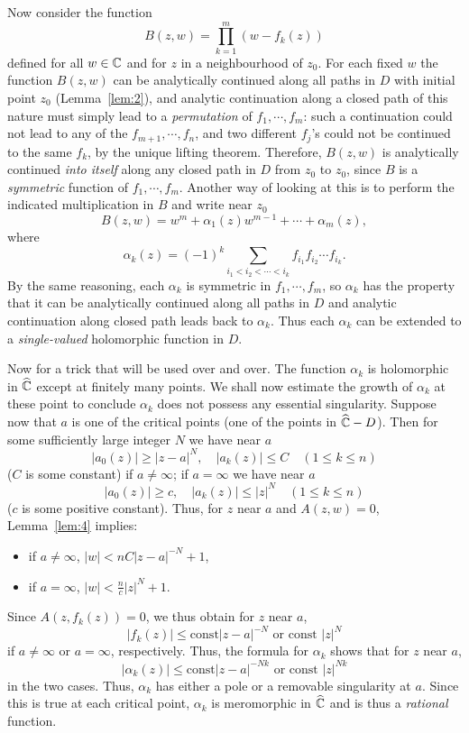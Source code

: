 \documentclass[a4paper,11pt]{article}
\begin{document}
\begin{myproof}
  Now consider the function
  $$
  B(z,w) = \prod_{k=1}^m (w-f_k(z))
  $$
  defined for all $w \in {\mathbb C}$ and for $z$ in a neighbourhood of
  $z_0$.  For each fixed $w$ the function $B(z,w)$ can be analytically
  continued along all paths in $D$ with initial point $z_0$
  (Lemma~\ref{lem:2}), and analytic continuation along a closed path
  of this nature must simply lead to a \emph{permutation} of $f_1,
  \cdots, f_m$: such a continuation could not lead to any of the
  $f_{m+1}, \cdots, f_n$, and two different $f_j$'s could not be
  continued to the same $f_k$, by the unique lifting theorem.
  Therefore, $B(z,w)$ is analytically continued \emph{into itself}
  along any closed path in $D$ from $z_0$ to $z_0$, since $B$ is a
  \emph{symmetric} function of $f_1, \cdots, f_m$.  Another way of
  looking at this is to perform the indicated multiplication in $B$
  and write near $z_0$
  $$
  B(z,w) = w^m + \alpha_1(z) w^{m-1} + \cdots + \alpha_m(z),
  $$
  where
  $$
  \alpha_k(z) = (-1)^k \sum_{i_1 < i_2 < \cdots < i_k} f_{i_1} f_{i_2}
  \cdots f_{i_k}.
  $$
  By the same reasoning, each $\alpha_k$ is symmetric in $f_1, \cdots,
  f_m$, so $\alpha_k$ has the property that it can be analytically
  continued along all paths in $D$ and analytic continuation along
  closed path leads back to $\alpha_k$.  Thus each $\alpha_k$ can be
  extended to a \emph{single-valued} holomorphic function in $D$.

  Now for a trick that will be used over and over.  The function
  $\alpha_k$ is holomorphic in $\widehat{{\mathbb C}}$ except at finitely
  many points.  We shall now estimate the growth of $\alpha_k$ at
  these point to conclude $\alpha_k$ does not possess any essential
  singularity.  Suppose now that $a$ is one of the critical points
  (one of the points in $\widehat{{\mathbb C}}-D$).  Then for some
  sufficiently large integer $N$ we have near $a$
  $$
  |a_0(z)| \ge |z-a|^N, \quad |a_k(z)| \le C \quad (1\le k\le n)
  $$
  ($C$ is some constant) if $a\ne \infty$; if $a=\infty$ we have near
  $a$
  $$
  |a_0(z)| \ge c, \quad |a_k(z)| \le |z|^N \quad (1\le k\le n)
  $$
  ($c$ is some positive constant).  Thus, for $z$ near $a$ and $A(z,w)
  = 0$, Lemma~\ref{lem:4} implies:
  \begin{itemize}
  \item if $a \ne \infty$, $|w| < nC|z-a|^{-N} + 1$,
  \item if $a = \infty$, $|w| < \frac{n}{c}|z|^{N} + 1$.
  \end{itemize}
  Since $A(z, f_k(z)) = 0$, we thus obtain for $z$ near $a$,
  $$
  |f_k(z)| \le \text{const}|z-a|^{-N}\text{ or const }|z|^N
  $$
  if $a \ne \infty$ or $a = \infty$, respectively.  Thus, the formula
  for $\alpha_k$ shows that for $z$ near $a$,
  $$
  |\alpha_k(z)| \le \text{const}|z-a|^{-Nk}\text{ or const }|z|^{Nk}
  $$
  in the two cases.  Thus, $\alpha_k$ has either a pole or a removable
  singularity at $a$.  Since this is true at each critical point,
  $\alpha_k$ is meromorphic in $\widehat{{\mathbb C}}$ and is thus a
  \emph{rational} function.


\end{myproof}
\end{document}
